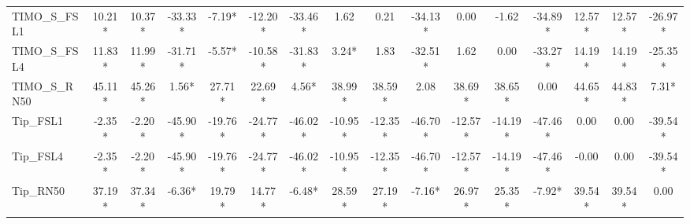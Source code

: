 \documentclass[conference,6pt]{IEEEtran}
\begin{document}
\begin{table}[H]
{\begin{tabular}{@{}l*{15}{c}@{}}
TIMO\_S\_FSL1 & 10.21* & 10.37* & -33.33* & -7.19* & -12.20* & -33.46* & 1.62 & 0.21 & -34.13* & 0.00 & -1.62 & -34.89* & 12.57* & 12.57* & -26.97* \\
TIMO\_S\_FSL4 & 11.83* & 11.99* & -31.71* & -5.57* & -10.58* & -31.83* & 3.24* & 1.83 & -32.51* & 1.62 & 0.00 & -33.27* & 14.19* & 14.19* & -25.35* \\
TIMO\_S\_RN50 & 45.11* & 45.26* & 1.56* & 27.71* & 22.69* & 4.56* & 38.99* & 38.59* & 2.08 & 38.69* & 38.65* & 0.00 & 44.65* & 44.83* & 7.31* \\
Tip\_FSL1 & -2.35* & -2.20* & -45.90* & -19.76* & -24.77* & -46.02* & -10.95* & -12.35* & -46.70* & -12.57* & -14.19* & -47.46* & 0.00 & 0.00 & -39.54* \\
Tip\_FSL4 & -2.35* & -2.20* & -45.90* & -19.76* & -24.77* & -46.02* & -10.95* & -12.35* & -46.70* & -12.57* & -14.19* & -47.46* & -0.00 & 0.00 & -39.54* \\
Tip\_RN50 & 37.19* & 37.34* & -6.36* & 19.79* & 14.77* & -6.48* & 28.59* & 27.19* & -7.16* & 26.97* & 25.35* & -7.92* & 39.54* & 39.54* & 0.00 \\
\bottomrule
\end{tabular}%
}
\end{table}

\FloatBarrier
\end{document}
